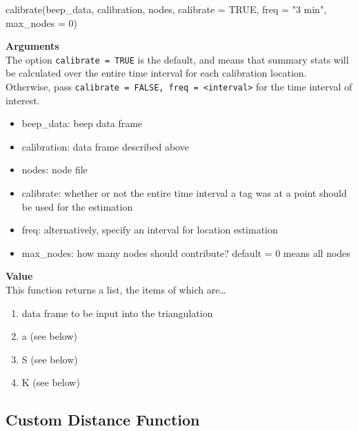 \documentclass[
]{book}
\newenvironment{Shaded}{\begin{snugshade}}{\end{snugshade}}
\newcommand{\AttributeTok}[1]{\textcolor[rgb]{0.77,0.63,0.00}{#1}}
\newcommand{\ConstantTok}[1]{\textcolor[rgb]{0.00,0.00,0.00}{#1}}
\newcommand{\DecValTok}[1]{\textcolor[rgb]{0.00,0.00,0.81}{#1}}
\newcommand{\FunctionTok}[1]{\textcolor[rgb]{0.00,0.00,0.00}{#1}}
\newcommand{\NormalTok}[1]{#1}
\newcommand{\StringTok}[1]{\textcolor[rgb]{0.31,0.60,0.02}{#1}}
\providecommand{\tightlist}{%
  \setlength{\itemsep}{0pt}\setlength{\parskip}{0pt}}
\begin{document}
\begin{Shaded}
\begin{Highlighting}[]
\FunctionTok{calibrate}\NormalTok{(beep\_data, calibration, nodes, }\AttributeTok{calibrate =} \ConstantTok{TRUE}\NormalTok{, }\AttributeTok{freq =} \StringTok{"3 min"}\NormalTok{, }\AttributeTok{max\_nodes =} \DecValTok{0}\NormalTok{)}
\end{Highlighting}
\end{Shaded}

\textbf{Arguments}\\
The option \texttt{calibrate\ =\ TRUE} is the default, and means that summary stats will be calculated over the entire time interval for each calibration location. Otherwise, pass \texttt{calibrate\ =\ FALSE,\ freq\ =\ \textless{}interval\textgreater{}} for the time interval of interest.

\begin{itemize}
\tightlist
\item
  beep\_data: beep data frame\\
\item
  calibration: data frame described above\\
\item
  nodes: node file\\
\item
  calibrate: whether or not the entire time interval a tag was at a point should be used for the estimation
\item
  freq: alternatively, specify an interval for location estimation
\item
  max\_nodes: how many nodes should contribute? default = 0 means all nodes
\end{itemize}

\textbf{Value}\\
This function returns a list, the items of which are\ldots{}

\begin{enumerate}
\def\labelenumi{\arabic{enumi}.}
\tightlist
\item
  data frame to be input into the triangulation\\
\item
  a (see below)\\
\item
  S (see below)\\
\item
  K (see below)
\end{enumerate}

\hypertarget{custom-distance-function}{%
\subsection{Custom Distance Function}\label{custom-distance-function}}
\end{document}
